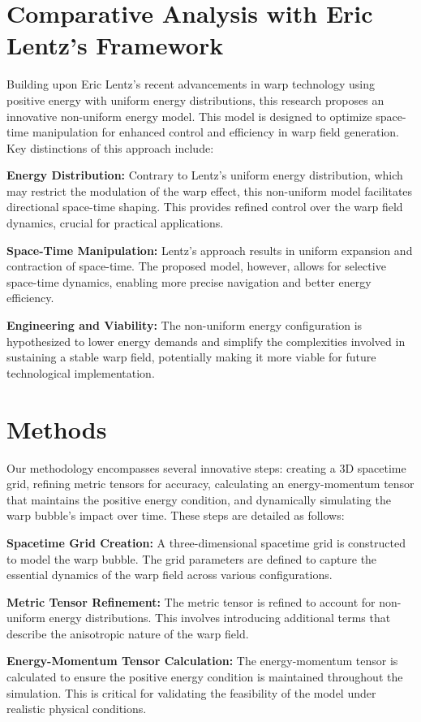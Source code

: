 \documentclass{article}
\begin{document}
\section*{Comparative Analysis with Eric Lentz's Framework}
Building upon Eric Lentz's recent advancements in warp technology using positive energy with uniform energy distributions, this research proposes an innovative non-uniform energy model. This model is designed to optimize space-time manipulation for enhanced control and efficiency in warp field generation. Key distinctions of this approach include:

\textbf{Energy Distribution:} Contrary to Lentz’s uniform energy distribution, which may restrict the modulation of the warp effect, this non-uniform model facilitates directional space-time shaping. This provides refined control over the warp field dynamics, crucial for practical applications.

\textbf{Space-Time Manipulation:} Lentz's approach results in uniform expansion and contraction of space-time. The proposed model, however, allows for selective space-time dynamics, enabling more precise navigation and better energy efficiency.

\textbf{Engineering and Viability:} The non-uniform energy configuration is hypothesized to lower energy demands and simplify the complexities involved in sustaining a stable warp field, potentially making it more viable for future technological implementation.

\section*{Methods}
Our methodology encompasses several innovative steps: creating a 3D spacetime grid, refining metric tensors for accuracy, calculating an energy-momentum tensor that maintains the positive energy condition, and dynamically simulating the warp bubble's impact over time. These steps are detailed as follows:

\textbf{Spacetime Grid Creation:} A three-dimensional spacetime grid is constructed to model the warp bubble. The grid parameters are defined to capture the essential dynamics of the warp field across various configurations.

\textbf{Metric Tensor Refinement:} The metric tensor is refined to account for non-uniform energy distributions. This involves introducing additional terms that describe the anisotropic nature of the warp field.

\textbf{Energy-Momentum Tensor Calculation:} The energy-momentum tensor is calculated to ensure the positive energy condition is maintained throughout the simulation. This is critical for validating the feasibility of the model under realistic physical conditions.
\end{document}
